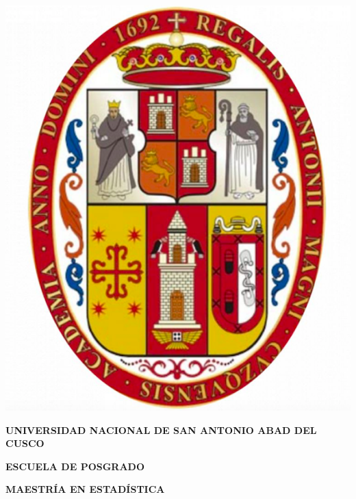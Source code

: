 \thispagestyle{empty}


\begin{center}
\includegraphics[scale=0.15]{UNSAAAC} 
\end{center}
\begin{center}

\begin{center}

\fontsize{14pt}{11pt}
\selectfont\bfseries { \textcolor{carmine}{UNIVERSIDAD NACIONAL DE SAN ANTONIO ABAD DEL CUSCO}} \\

\vspace{0.3cm}
\fontsize{14pt}{11pt}

\selectfont\bfseries { \textcolor{carmine}{ESCUELA DE POSGRADO} } \\
\fontsize{14pt}{11pt}

\vspace{0.3cm}
\selectfont\bfseries {MAESTRÍA EN ESTADÍSTICA} 
\end{center}

\vspace{3cm}


\fboxsep 16pt
\end{center}

